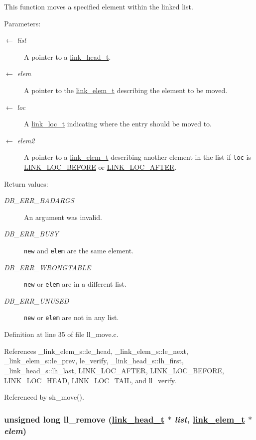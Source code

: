 This function moves a specified element within the linked list.

\begin{Desc}
\item[Parameters:]
\begin{description}
\item[\mbox{$\leftarrow$} {\em list}]A pointer to a \hyperlink{group__dbprim__link_ga0}{link\_\-head\_\-t}. \item[\mbox{$\leftarrow$} {\em elem}]A pointer to the \hyperlink{group__dbprim__link_ga1}{link\_\-elem\_\-t} describing the element to be moved. \item[\mbox{$\leftarrow$} {\em loc}]A \hyperlink{group__dbprim__link_ga4}{link\_\-loc\_\-t} indicating where the entry should be moved to. \item[\mbox{$\leftarrow$} {\em elem2}]A pointer to a \hyperlink{group__dbprim__link_ga1}{link\_\-elem\_\-t} describing another element in the list if {\tt loc} is \hyperlink{group__dbprim__link_gga28a135}{LINK\_\-LOC\_\-BEFORE} or \hyperlink{group__dbprim__link_gga28a136}{LINK\_\-LOC\_\-AFTER}.\end{description}
\end{Desc}
\begin{Desc}
\item[Return values:]
\begin{description}
\item[{\em DB\_\-ERR\_\-BADARGS}]An argument was invalid. \item[{\em DB\_\-ERR\_\-BUSY}]{\tt new} and {\tt elem} are the same element. \item[{\em DB\_\-ERR\_\-WRONGTABLE}]{\tt new} or {\tt elem} are in a different list. \item[{\em DB\_\-ERR\_\-UNUSED}]{\tt new} or {\tt elem} are not in any list.\end{description}
\end{Desc}


Definition at line 35 of file ll\_\-move.c.

References \_\-link\_\-elem\_\-s::le\_\-head, \_\-link\_\-elem\_\-s::le\_\-next, \_\-link\_\-elem\_\-s::le\_\-prev, le\_\-verify, \_\-link\_\-head\_\-s::lh\_\-first, \_\-link\_\-head\_\-s::lh\_\-last, LINK\_\-LOC\_\-AFTER, LINK\_\-LOC\_\-BEFORE, LINK\_\-LOC\_\-HEAD, LINK\_\-LOC\_\-TAIL, and ll\_\-verify.

Referenced by sh\_\-move().\hypertarget{group__dbprim__link_ga8}{
\subsubsection[ll\_\-remove]{\setlength{\rightskip}{0pt plus 5cm}unsigned long ll\_\-remove (\hyperlink{struct__link__head__s}{link\_\-head\_\-t} $\ast$ {\em list}, \hyperlink{struct__link__elem__s}{link\_\-elem\_\-t} $\ast$ {\em elem})}}
\label{group__dbprim__link_ga8}


